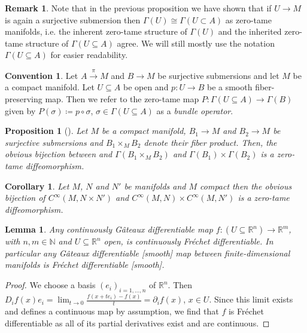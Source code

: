\documentclass[12pt,a4paper]{article}
\theoremstyle{plain}
\newtheorem{corollary}[theorem]{Corollary}
\newtheorem{lemma}[theorem]{Lemma}
\newtheorem{proposition}[theorem]{Proposition}
\theoremstyle{definition}
\newtheorem{remark}[theorem]{Remark}
\newtheorem{convention}[theorem]{Convention}
\newcommand{\R}{\mathbb{R}}
\newcommand{\N}{\mathbb{N}}
\newcommand{\del}{\partial}
\begin{document}
\begin{remark}
    Note that in the previous proposition we have shown that if $U\to M$ is again a surjective submersion then $\Gamma(U)\cong \Gamma(U\subset A)$ as zero-tame manifolds, i.e. the inherent zero-tame structure of $\Gamma(U)$ and the inherited zero-tame structure of $\Gamma(U\subseteq A)$ agree.
    We will still mostly use the notation $\Gamma(U\subseteq A)$ for easier readability.
\end{remark}



\begin{convention}
\label{Conv:FiberBundleOperators}
Let $A\xrightarrow{\pi} M$ and $B\to M$ be surjective submersions and let $M$ be a compact manifold. Let $U\subseteq A$ be open and $p:U\to B$ be a smooth fiber-preserving map. Then we refer to the zero-tame map $P:\Gamma(U\subseteq A)\to \Gamma(B)$ given by $P(\sigma)\coloneqq p\circ \sigma$, $\sigma\in \Gamma(U\subseteq A)$ as a \textit{bundle operator}. 
\end{convention}




\begin{proposition}[{\cite[Lemma 3.2.9]{RWang}}]
\label{Prop:SmMapsIntoProd=ProdOfSmMaps}
Let $M$ be a compact manifold, $B_1\to M$ and $B_2\to M$ be surjective submersions and $B_1\times_MB_2$ denote their fiber product. Then, the obvious bijection between and $\Gamma(B_1\times_MB_2)$ and $\Gamma(B_1)\times \Gamma(B_2)$ is a zero-tame diffeomorphism. 
\end{proposition}



\begin{corollary}
Let $M$, $N$ and $N'$ be manifolds and $M$ compact then the obvious bijection of $C^\infty(M,N\times N')$ and $C^\infty(M,N)\times C^\infty(M,N')$ is a zero-tame diffeomorphism.
\end{corollary}




\begin{lemma}
\label{Lemma:GateauxImpliesFrechetOnFinDim}
Any continuously G\^ateaux differentiable map $f:(U\subseteq \R^n)\to \R^m$, with $n,m\in \N$ and $U\subseteq \R^n$ open, is continuously Fréchet differentiable. In particular any G\^ateaux differentiable [smooth] map between finite-dimensional manifolds is Fréchet differentiable [smooth].
\end{lemma}
\begin{proof}
We choose a basis $(e_i)_{i=1,\ldots,n}$ of $\R^n$. Then $D_if(x)e_i=\lim_{t\to 0}\frac{f(x+t e_i)-f(x)}{t}=\del_if (x)$, $x\in U$. Since this limit exists and defines a continuous map by assumption, we find that $f$ is Fréchet differentiable as all of its partial derivatives exist and are continuous.
\end{proof}
\end{document}
